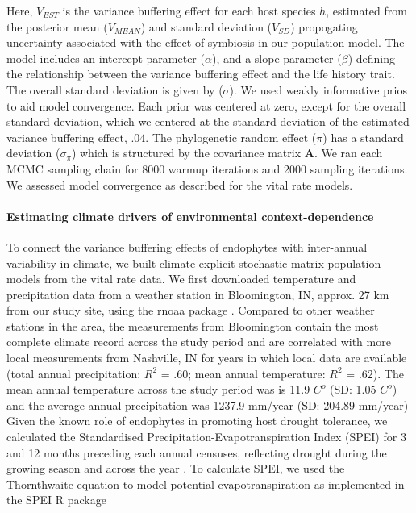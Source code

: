 \documentclass[12pt]{article}
\begin{document}
Here, $V_{EST}$ is the variance buffering effect for each host species $h$, estimated from the posterior mean ($V_{MEAN}$) and standard deviation ($V_{SD}$) propogating uncertainty associated with the effect of symbiosis in our population model.
The model includes an intercept parameter ($\alpha$), and a slope parameter ($\beta$) defining the relationship between the variance buffering effect and the life history trait. 
The overall standard deviation is given by ($\sigma$). 
We used weakly informative prios to aid model convergence.
Each prior was centered at zero, except for the overall standard deviation, which we centered at the standard deviation of the estimated variance buffering effect, $.04$.
The phylogenetic random effect ($\pi$) has a standard deviation ($\sigma_{\pi}$) which is structured by the covariance matrix \textbf{A}.
We ran each MCMC sampling chain for 8000 warmup iterations and 2000 sampling iterations. 
We assessed model convergence as described for the vital rate models.


\paragraph*{Estimating climate drivers of environmental context-dependence}
To connect the variance buffering effects of endophytes with inter-annual variability in climate, we built climate-explicit stochastic matrix population models from the vital rate data.
We first downloaded temperature and precipitation data from a weather station in Bloomington, IN,  approx. 27 km from our study site, using the rnoaa package \cite{chamberlain2022package}. 
Compared to other weather stations in the area, the measurements from Bloomington contain the most complete climate record across the study period and are correlated with more local measurements from Nashville, IN for years in which local data are available (total annual precipitation: $R^2$ = .60; mean annual temperature: $R^2$ = .62).
The mean annual temperature across the study period was is 11.9 $C^o $ (SD: 1.05 $C^o $) and the average annual precipitation was 1237.9 mm/year (SD: 204.89 mm/year)
Given the known role of endophytes in promoting host drought tolerance, we calculated the Standardised Precipitation-Evapotranspiration Index (SPEI) for 3 and 12 months preceding each annual censuses, reflecting drought during the growing season and across the year \cite{vicente2010multiscalar}.
To calculate SPEI, we used the Thornthwaite equation to model potential evapotranspiration as implemented in the SPEI R package \cite{begueria2013spei}
\end{document}
